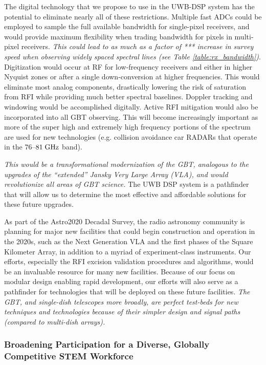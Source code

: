 \documentclass[10pt]{myNSF}
\begin{document}
The digital technology that we propose to use in the UWB-DSP system
has the potential to eliminate nearly all of these restrictions.
Multiple fast ADCs could be employed to sample the full available
bandwidth for single-pixel receivers, and would provide maximum
flexibility when trading bandwidth for pixels in multi-pixel
receivers.  \emph{This could lead to as much as a factor of ***
  increase in survey speed when observing widely spaced spectral lines
  (see Table \ref{table:rx_bandwidth})}.  Digitization would occur at
RF for low-frequency receivers and either in higher Nyquist zones or
after a single down-conversion at higher frequencies.  This would
eliminate most analog components, drastically lowering the risk of
saturation from RFI while providing much better spectral baselines.
Doppler tracking and windowing would be accomplished digitally.
Active RFI mitigation would also be incorporated into all GBT
observing.  This will become increasingly important as more of the
super high and extremely high frequency portions of the spectrum are
used for new technologies (e.g. collision avoidance car RADARs that
operate in the $76$--$81\; \textrm{GHz}$ band).

\emph{This would be a transformational modernization of the GBT,
  analogous to the upgrades of the ``extended'' Jansky Very Large
  Array (VLA), and would revolutionize all areas of GBT science.}  The
UWB DSP system is a pathfinder that will allow us to determine the
most effective and affordable solutions for these future upgrades.


As part of the Astro2020 Decadal Survey, the radio astronomy community
is planning for major new facilities that could begin construction and
operation in the 2020s, such as the Next Generation VLA and the first
phases of the Square Kilometer Array, in addition to a myriad of
experiment-class instruments.  Our efforts, especially the RFI
excision validation procedures and algorithms, would be an invaluable
resource for many new facilities.  Because of our focus on modular
design enabling rapid development, our efforts will also serve as a
pathfinder for technologies that will be deployed on these future
facilities.  \emph{The GBT, and single-dish telescopes more broadly,
  are perfect test-beds for new techniques and technologies because of
  their simpler design and signal paths (compared to multi-dish
  arrays).}

\subsubsection{Broadening Participation for a Diverse, Globally
  Competitive STEM Workforce}
\label{sec:workforce}
\end{document}
